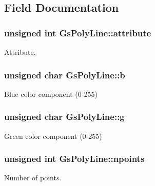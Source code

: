 \subsection{Field Documentation}
\hypertarget{structGsPolyLine_af58d38050162099d09ee1f72b228af19}{}
\subsubsection[{attribute}]{\setlength{\rightskip}{0pt plus 5cm}unsigned int Gs\+Poly\+Line\+::attribute}\label{structGsPolyLine_af58d38050162099d09ee1f72b228af19}


Attribute. 

\hypertarget{structGsPolyLine_abe1fc08cc228892b44f4a7b6045ff57c}{}
\subsubsection[{b}]{\setlength{\rightskip}{0pt plus 5cm}unsigned char Gs\+Poly\+Line\+::b}\label{structGsPolyLine_abe1fc08cc228892b44f4a7b6045ff57c}


Blue color component (0-\/255) 

\hypertarget{structGsPolyLine_a3d27095afb8a49fac56a51addbb7060a}{}
\subsubsection[{g}]{\setlength{\rightskip}{0pt plus 5cm}unsigned char Gs\+Poly\+Line\+::g}\label{structGsPolyLine_a3d27095afb8a49fac56a51addbb7060a}


Green color component (0-\/255) 

\hypertarget{structGsPolyLine_a48a124ee4e78b6d9043783a9ac17ab32}{}
\subsubsection[{npoints}]{\setlength{\rightskip}{0pt plus 5cm}unsigned int Gs\+Poly\+Line\+::npoints}\label{structGsPolyLine_a48a124ee4e78b6d9043783a9ac17ab32}


Number of points. 

\hypertarget{structGsPolyLine_a952fee47dff8f921dc3ed3696c11f45f}{}
